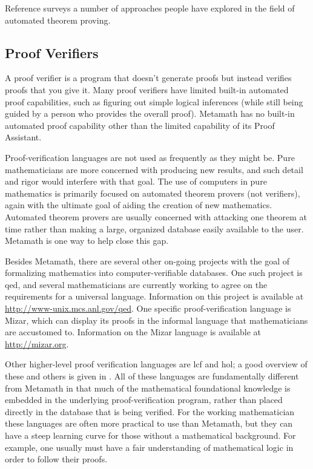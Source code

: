 Reference \cite{Bledsoe} surveys a number of approaches
people have explored in the field of automated theorem proving.


\subsection{Proof Verifiers}\label{proofverifiers}

A proof verifier is a program that doesn't generate proofs but instead
verifies proofs that you give it.  Many proof verifiers have limited built-in
automated proof capabilities, such as figuring out simple logical inferences
(while still being guided by a person who provides the overall proof).  Metamath
has no built-in automated proof capability other than the limited
capability of its Proof Assistant.

Proof-verification languages are not used as frequently as they might be.
Pure mathematicians are more concerned with producing new results, and such
detail and rigor would interfere with that goal.  The use of computers in pure
mathematics is primarily focused on automated theorem provers (not verifiers),
again with the ultimate goal of aiding the creation of new mathematics.
Automated theorem provers are usually concerned with attacking one theorem at
time rather than making a large, organized database easily available to the
user.  Metamath is one way to help close this gap.

Besides Metamath, there are several other on-going projects with the goal of
formalizing mathematics into computer-verifiable databases. One such project
is {\sc qed}, and several mathematicians
are currently working to agree on the requirements for a universal language.
Information on this project is available
at \url{http://www-unix.mcs.anl.gov/qed}.  One
specific proof-verification language is Mizar, which can display
its proofs in the informal language that mathematicians are accustomed to.
Information on the Mizar language is available at \url{http://mizar.org}.

Other higher-level proof verification languages are {\sc lcf} and {\sc hol}; a good overview of these and others
is given in \cite{Harrison}.  All of these languages are fundamentally
different from Metamath in that much of the mathematical foundational
knowledge is embedded in the underlying proof-verification program, rather
than placed directly in the database that is being verified.  For the working
mathematician these languages are often more practical to use than Metamath,
but they can have a steep learning curve for those without a mathematical
background.  For example, one usually must have a fair understanding of
mathematical logic in order to follow their proofs.

